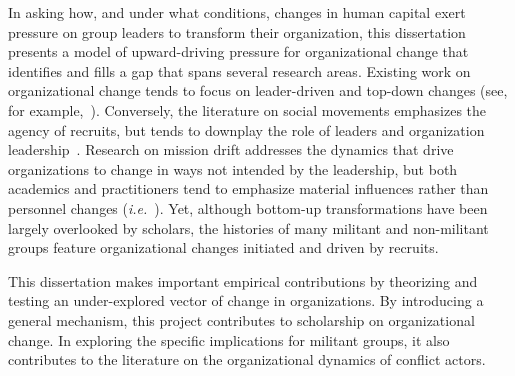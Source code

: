 In asking how, and under what conditions, changes in human capital exert pressure on group leaders to transform their organization, this dissertation presents a model of upward-driving pressure for organizational change that identifies and fills a gap that spans several research areas. Existing work on organizational change tends to focus on leader-driven and top-down changes (see, for example,~\cite{armenakis1999organizational, hannan1984structural, kanter2003challenge, fernandez2017managing}). Conversely, the literature on social movements emphasizes the agency of recruits, but tends to downplay the role of leaders and organization leadership~\autocite{campbell_2005, morris2004leadership}. Research on mission drift addresses the dynamics that drive organizations to change in ways not intended by the leadership, but both academics and practitioners tend to emphasize material influences rather than personnel changes (\textit{i.e.}~\cite{cornforth2014understanding, jones2007multiple, schleckser2015inc}). Yet, although bottom-up transformations have been largely overlooked by scholars, the histories of many militant and non-militant groups feature organizational changes initiated and driven by recruits.

This dissertation makes important empirical contributions by theorizing and
testing an under-explored vector of change in organizations. By introducing a general mechanism, this project contributes to scholarship on organizational change. In exploring the specific implications for militant groups, it also contributes to the literature on the organizational dynamics of conflict actors.  

